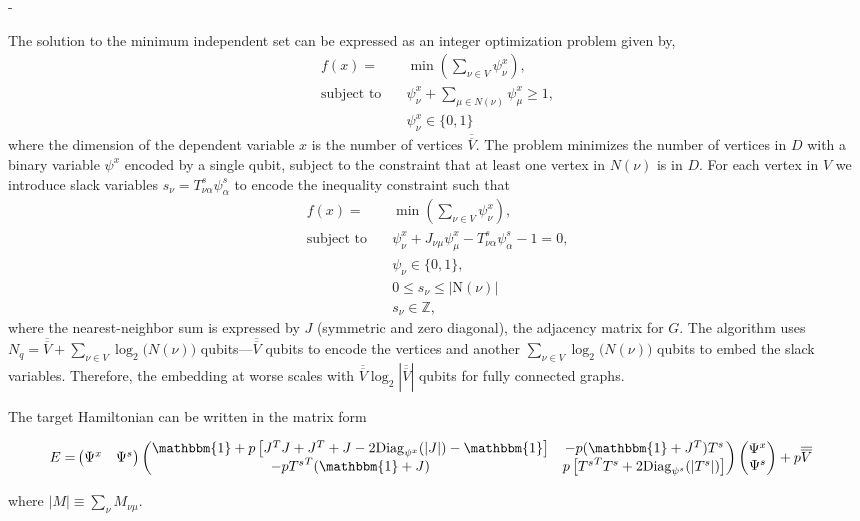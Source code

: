 -\documentclass[prd,twocolumn,tightenlines,preprintnumbers,showpacs,superscriptaddress,notitlepage,nofootinbib,eqsecnum,floatfix,longbibliography]{revtex4}
\begin{document}
The solution to the minimum independent set can be expressed as an integer optimization problem given by,
\begin{align}
    f(x) = &\min\left(\sum_{\nu \in V} \psi^x_{\nu}\right),\\
    \textrm{subject to} \quad & \psi^x_{\nu} + \sum_{\mu \in \mathit{N}(\nu)} \psi^x_{\mu} \geq 1,\\
    & \psi^x_{\nu} \in \{0, 1\}
\end{align}
where the dimension of the dependent variable $x$ is the number of vertices $\overline{\overline{V}}$.
The problem minimizes the number of vertices in $D$ with a binary variable $\psi^x$ encoded by a single qubit, subject to the constraint that at least one vertex in $\mathit{N}(\nu)$ is in $D$.
For each vertex in $V$ we introduce slack variables $s_{\nu} = T^s_{\nu \alpha} \psi^s_{\alpha}$ to encode the inequality constraint such that
\begin{align}
    f(x) = &\min(\sum_{\nu\in V} \psi^x_{\nu}),\\
    \textrm{subject to} \quad & \psi^x_{\nu} + J_{\nu \mu} \psi^x_{\mu}- T^s_{\nu \alpha} \psi^s_{\alpha}  - 1 = 0,\\
    & \psi_{\nu} \in \{0, 1\},\\
    & 0 \leq s_{\nu} \leq |\mathrm{N}(\nu)|\\
    & s_{\nu} \in \mathbb{Z},
\end{align}
where the nearest-neighbor sum is expressed by $J$ (symmetric and zero diagonal), the adjacency matrix for $G$.
The algorithm uses $N_q = \overline{\overline{V}} + \sum_{\nu \in V} \log_2 \mathit(N(\nu))$ qubits---$\overline{\overline{V}}$ qubits to encode the vertices and another $\sum_{\nu \in V} \log_2 \mathit(N(\nu))$ qubits to embed the slack variables.
Therefore, the embedding at worse scales with $\overline{\overline{V}} \log_2 |\overline{\overline{V}}|$ qubits for fully connected graphs.

The target Hamiltonian can be written in the matrix form
\begin{widetext}
\begin{align}
    E = &
    \begin{pmatrix}
    \Psi^x & \Psi^s
    \end{pmatrix}
    \begin{pmatrix}
    \mathbbm{1} + p\left[J^T J + J^T + J - 2 \mathrm{Diag}_{\psi^x}(|J|) - \mathbbm{1} \right] & - p(\mathbbm{1}+J^T)T^s\\
    - p{T^s}^T(\mathbbm{1}+J)& p\left[{T^s}^T T^s + 2\mathrm{Diag}_{\psi^s}(|T^s|)\right]
    \end{pmatrix}
    \begin{pmatrix}
    \Psi^x\\ \Psi^s
    \end{pmatrix} + p \overline{\overline{V}}
    \label{eq:matrix_form}
\end{align}
\end{widetext}
where $ |M| \equiv \sum_{\nu} M_{\nu \mu}$.
\end{document}
